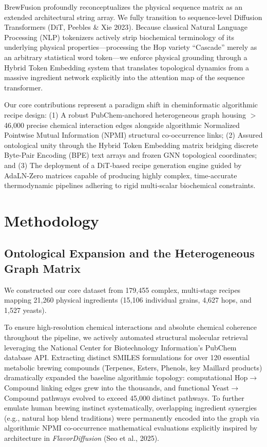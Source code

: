 \documentclass[10pt,twocolumn,letterpaper]{article}
\begin{document}
BrewFusion profoundly reconceptualizes the physical sequence matrix as an extended architectural string array. We fully transition to sequence-level Diffusion Transformers (DiT, Peebles \& Xie 2023). Because classical Natural Language Processing (NLP) tokenizers actively strip biochemical terminology of its underlying physical properties---processing the Hop variety ``Cascade'' merely as an arbitrary statistical word token---we enforce physical grounding through a Hybrid Token Embedding system that translates topological dynamics from a massive ingredient network explicitly into the attention map of the sequence transformer.

Our core contributions represent a paradigm shift in cheminformatic algorithmic recipe design: (1) A robust PubChem-anchored heterogeneous graph housing $>$46,000 precise chemical interaction edges alongside algorithmic Normalized Pointwise Mutual Information (NPMI) structural co-occurrence links; (2) Assured ontological unity through the Hybrid Token Embedding matrix bridging discrete Byte-Pair Encoding (BPE) text arrays and frozen GNN topological coordinates; and (3) The deployment of a DiT-based recipe generation engine guided by AdaLN-Zero matrices capable of producing highly complex, time-accurate thermodynamic pipelines adhering to rigid multi-scalar biochemical constraints.

\section{Methodology}

\subsection{Ontological Expansion and the Heterogeneous Graph Matrix}
We constructed our core dataset from 179,455 complex, multi-stage recipes mapping 21,260 physical ingredients (15,106 individual grains, 4,627 hops, and 1,527 yeasts).

To ensure high-resolution chemical interactions and absolute chemical coherence throughout the pipeline, we actively automated structural molecular retrieval leveraging the National Center for Biotechnology Information's PubChem database API. Extracting distinct SMILES formulations for over 120 essential metabolic brewing compounds (Terpenes, Esters, Phenols, key Maillard products) dramatically expanded the baseline algorithmic topology: computational Hop$\rightarrow$Compound linking edges grew into the thousands, and functional Yeast$\rightarrow$Compound pathways evolved to exceed 45,000 distinct pathways. To further emulate human brewing instinct systematically, overlapping ingredient synergies (e.g., natural hop blend traditions) were permanently encoded into the graph via algorithmic NPMI co-occurrence mathematical evaluations explicitly inspired by architecture in \textit{FlavorDiffusion} (Seo et al., 2025).
\end{document}
